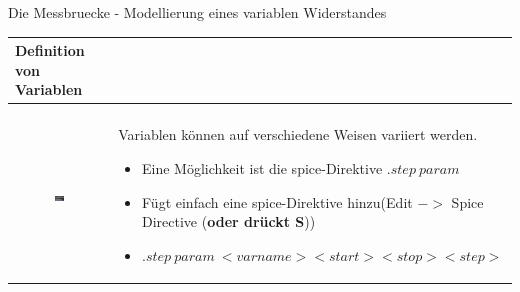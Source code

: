 \begin{frame}[t]{Die Messbruecke - Modellierung eines variablen Widerstandes} 
    \begin{spacing}{0.9} \begin{tiny}
      \begin{table}[h!]
      \begin{tabular}{p{3cm} p{7cm}}
        \hline
        \textbf{Definition von Variablen} \\
        \hline \\
        \begin{minipage}{.3\textwidth}
            \begin{figure}
                \centering
                \includegraphics[width=0.9\linewidth]{pictures/step_param.png}
            \end{figure}
          \end{minipage} 
          & 
          \begin{minipage}{.7\textwidth}
            Variablen können auf verschiedene Weisen variiert werden.\newline 
            \begin{itemize}
                \item Eine Möglichkeit ist die spice-Direktive $.step\ param$
                \item Fügt einfach eine spice-Direktive hinzu\newline (Edit $->$ Spice Directive (\textbf{oder drückt S}))
                \item $.step\ param\ <varname> <start> <stop> <step>$
            \end{itemize}
          \end{minipage} 
          \\
      \end{tabular}
        \\      
      \begin{tabular}{p{5cm} p{5cm}}
        \hline

\end{tabular}
\end{table}
\end{tiny}
\end{spacing}
\end{frame}

